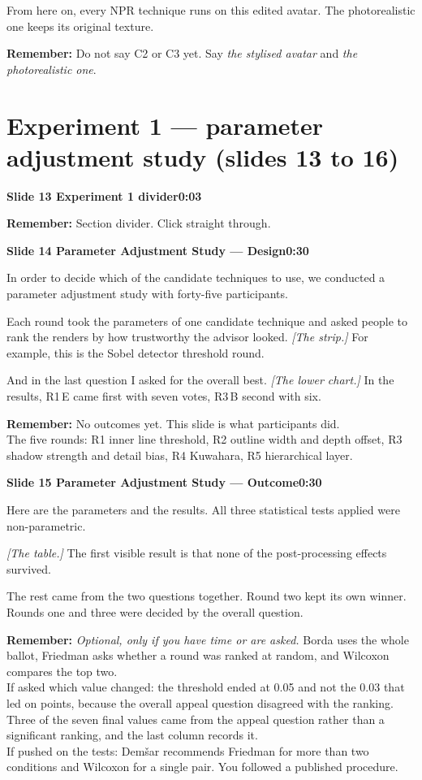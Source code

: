 \documentclass[11pt,a4paper]{article}
\newcommand{\slidehead}[3]{%
  \needspace{5\baselineskip}
  \vspace{0.9em}
  \noindent\colorbox{knblue}{\parbox{0.978\textwidth}{\vspace{1pt}\color{white}\textbf{Slide #1 \quad #2}\hfill\textbf{#3}\vspace{1pt}}}
  \vspace{0.35em}\par}
\newcommand{\remind}[1]{%
  \vspace{0.15em}
  \noindent\colorbox{knlight}{\parbox{0.972\textwidth}{\small\color{knblue}\textbf{Remember:} #1}}
  \vspace{0.2em}\par}
\newcommand{\pointto}[1]{{\color{knaccent}\textit{[#1]}}}
\begin{document}
From here on, every NPR technique runs on this edited avatar. The photorealistic one keeps its original texture.

\remind{Do not say C2 or C3 yet. Say \emph{the stylised avatar} and \emph{the photorealistic one}.}

\section*{\color{knblue}Experiment 1 — parameter adjustment study (slides 13 to 16)}

\slidehead{13}{Experiment 1 divider}{0:03}

\remind{Section divider. Click straight through.}

\slidehead{14}{Parameter Adjustment Study — Design}{0:30}

In order to decide which of the candidate techniques to use, we conducted a parameter adjustment study with forty-five participants.

Each round took the parameters of one candidate technique and asked people to rank the renders by how trustworthy the advisor looked. \pointto{The strip.} For example, this is the Sobel detector threshold round.

And in the last question I asked for the overall best. \pointto{The lower chart.} In the results, R1\,E came first with seven votes, R3\,B second with six.

\remind{No outcomes yet. This slide is what participants did.\\[0.4em] The five rounds: R1 inner line threshold, R2 outline width and depth offset, R3 shadow strength and detail bias, R4 Kuwahara, R5 hierarchical layer.}

\slidehead{15}{Parameter Adjustment Study — Outcome}{0:30}

Here are the parameters and the results. All three statistical tests applied were non-parametric.

\pointto{The table.} The first visible result is that none of the post-processing effects survived.

The rest came from the two questions together. Round two kept its own winner. Rounds one and three were decided by the overall question.

\remind{\emph{Optional, only if you have time or are asked.} Borda uses the whole ballot, Friedman asks whether a round was ranked at random, and Wilcoxon compares the top two.\\[0.4em] If asked which value changed: the threshold ended at 0.05 and not the 0.03 that led on points, because the overall appeal question disagreed with the ranking.\\[0.4em] Three of the seven final values came from the appeal question rather than a significant ranking, and the last column records it.\\[0.4em] If pushed on the tests: Dem\v{s}ar recommends Friedman for more than two conditions and Wilcoxon for a single pair. You followed a published procedure.}
\end{document}
